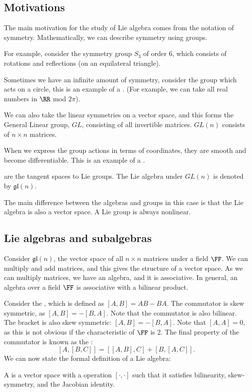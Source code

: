 \subsection{Motivations}

The main motivation for the study of Lie algebra comes from the notation of symmetry. Mathematically, we can describe symmetry using groups. \newline

For example, consider the symmetry group $S_3$ of order 6, which consists of rotations and reflections (on an equilateral triangle). \newline

Sometimes we have an infinite amount of symmetry, consider the group which acts on a circle, this is an example of a . (For example, we can take all real numbers in $\RR$ mod $2\pi$). \newline


We can also take the linear symmetries on a vector space, and this forms the General Linear group, $GL$, consisting of all invertible matrices. $GL(n)$ consists of $n\times n$ matrices. \newline

When we express the group actions in terms of coordinates, they are smooth and become differentiable. This is an example of a . \newline

 are the tangent spaces to Lie groups. The Lie algebra under $GL(n)$ is denoted by $\mathfrak{gl}(n)$. \newline

The main difference between the algebras and groups in this case is that the Lie algebra is also a vector space. A Lie group is always nonlinear. 

\subsection{Lie algebras and subalgebras}
Consider $\mathfrak{gl}(n)$, the vector space of all $n \times n$ matrices under a field $\FF$. We can multiply and add matrices, and this gives the structure of a vector space. As we can multiply matrices, we have an algebra, and it is associative. In general, an algebra over a field $\FF$ is associative with a bilinear product. \newline

Consider the , which is defined as $[A,B] = AB - BA$. The commutator is skew symmetric, as $[A,B] = -[B,A]$.  Note that the commutator is also bilinear. The bracket is also skew symmetric: $[A,B] = -[B,A]$. Note that $[A,A] = 0$, as this is not obvious if the characteristic of $\FF$ is 2. The final property of the commutator is known as the : 
\[ [A,[B,C]] = [[A,B], C] + [B, [A,C]]. \] 
We can now state the formal definition of a Lie algebra:
\begin{definition}
A  is a vector space with a operation $[\cdot,\cdot]$ such that it satisfies bilinearity, skew-symmetry, and the Jacobian identity. 
\end{definition}

